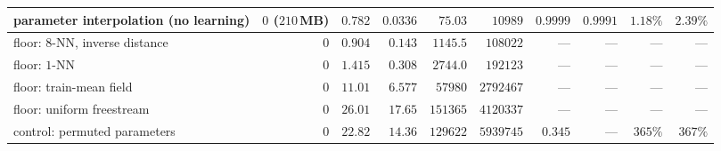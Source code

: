 \begin{table}[t]
\begin{adjustbox}{max width=\textwidth}
\begin{tabular}{l r r r r r r r r r}
\textbf{parameter interpolation (no learning)} & $0$ ($210$\,MB) & $0.782$ & $0.0336$ & $75.03$ & $10989$ & $0.9999$ & $0.9991$ & $\mathbf{1.18\%}$ & $\mathbf{2.39\%}$ \\
\midrule
\quad floor: $8$-NN, inverse distance & $0$ & $0.904$ & $0.143$ & $1145.5$ & $108022$ & --- & --- & --- & --- \\
\quad floor: $1$-NN & $0$ & $1.415$ & $0.308$ & $2744.0$ & $192123$ & --- & --- & --- & --- \\
\quad floor: train-mean field & $0$ & $11.01$ & $6.577$ & $57980$ & $2792467$ & --- & --- & --- & --- \\
\quad floor: uniform freestream & $0$ & $26.01$ & $17.65$ & $151365$ & $4120337$ & --- & --- & --- & --- \\
\quad control: permuted parameters & $0$ & $22.82$ & $14.36$ & $129622$ & $5939745$ & $0.345$ & --- & $365\%$ & $367\%$ \\
\bottomrule
\end{tabular}
\end{adjustbox}
\end{table}

